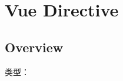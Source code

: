 \part{Vue Directive}


\chapter{Overview}

\begin{compactitem}
\item 类型：
\end{compactitem}

\begin{lstlisting}[language=JavaScript]

\end{lstlisting}



\begin{lstlisting}[language=JavaScript]

\end{lstlisting}




\begin{lstlisting}[language=JavaScript]

\end{lstlisting}




\begin{lstlisting}[language=JavaScript]

\end{lstlisting}




\begin{lstlisting}[language=JavaScript]

\end{lstlisting}




\begin{lstlisting}[language=JavaScript]

\end{lstlisting}




\begin{lstlisting}[language=JavaScript]

\end{lstlisting}




\begin{lstlisting}[language=JavaScript]

\end{lstlisting}

